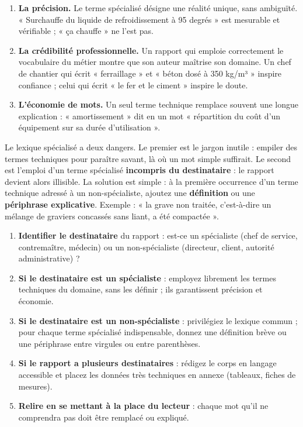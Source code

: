 \documentclass[11pt]{article}
\newcommand{\cle}[1]{{\popxbold\color{popdark}#1}}
\begin{document}
\begin{enumerate}
\item \textbf{La précision.} Le terme spécialisé désigne une réalité unique, sans ambiguïté. « Surchauffe du liquide de refroidissement à 95 degrés » est mesurable et vérifiable ; « ça chauffe » ne l'est pas.
\item \textbf{La crédibilité professionnelle.} Un rapport qui emploie correctement le vocabulaire du métier montre que son auteur maîtrise son domaine. Un chef de chantier qui écrit « ferraillage » et « béton dosé à 350 kg/m³ » inspire confiance ; celui qui écrit « le fer et le ciment » inspire le doute.
\item \textbf{L'économie de mots.} Un seul terme technique remplace souvent une longue explication : « amortissement » dit en un mot « répartition du coût d'un équipement sur sa durée d'utilisation ».
\end{enumerate}

\begin{attention}
Le lexique spécialisé a deux dangers. Le premier est le \cle{jargon} inutile : empiler des termes techniques pour paraître savant, là où un mot simple suffirait. Le second est l'emploi d'un terme spécialisé \textbf{incompris du destinataire} : le rapport devient alors illisible. La solution est simple : à la première occurrence d'un terme technique adressé à un non-spécialiste, ajoutez une \textbf{définition} ou une \textbf{périphrase explicative}. Exemple : « la grave non traitée, c'est-à-dire un mélange de graviers concassés sans liant, a été compactée ».
\end{attention}

\begin{methode}
\begin{enumerate}
\item \textbf{Identifier le destinataire} du rapport : est-ce un spécialiste (chef de service, contremaître, médecin) ou un non-spécialiste (directeur, client, autorité administrative) ?
\item \textbf{Si le destinataire est un spécialiste} : employez librement les termes techniques du domaine, sans les définir ; ils garantissent précision et économie.
\item \textbf{Si le destinataire est un non-spécialiste} : privilégiez le lexique commun ; pour chaque terme spécialisé indispensable, donnez une définition brève ou une périphrase entre virgules ou entre parenthèses.
\item \textbf{Si le rapport a plusieurs destinataires} : rédigez le corps en langage accessible et placez les données très techniques en annexe (tableaux, fiches de mesures).
\item \textbf{Relire en se mettant à la place du lecteur} : chaque mot qu'il ne comprendra pas doit être remplacé ou expliqué.
\end{enumerate}
\end{methode}
\end{document}

